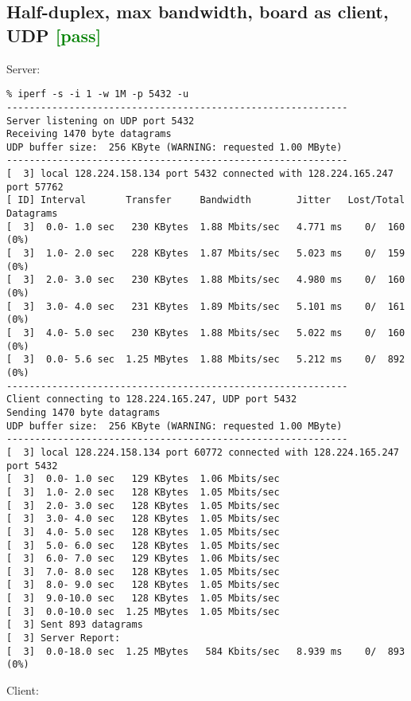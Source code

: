 \documentclass[a4paper]{report}
\begin{document}
\subsection{Half-duplex, max bandwidth, board as client, UDP \textcolor{green}{[pass]}}
Server:
\begin{lstlisting}
% iperf -s -i 1 -w 1M -p 5432 -u
------------------------------------------------------------
Server listening on UDP port 5432
Receiving 1470 byte datagrams
UDP buffer size:  256 KByte (WARNING: requested 1.00 MByte)
------------------------------------------------------------
[  3] local 128.224.158.134 port 5432 connected with 128.224.165.247 port 57762
[ ID] Interval       Transfer     Bandwidth        Jitter   Lost/Total Datagrams
[  3]  0.0- 1.0 sec   230 KBytes  1.88 Mbits/sec   4.771 ms    0/  160 (0%)
[  3]  1.0- 2.0 sec   228 KBytes  1.87 Mbits/sec   5.023 ms    0/  159 (0%)
[  3]  2.0- 3.0 sec   230 KBytes  1.88 Mbits/sec   4.980 ms    0/  160 (0%)
[  3]  3.0- 4.0 sec   231 KBytes  1.89 Mbits/sec   5.101 ms    0/  161 (0%)
[  3]  4.0- 5.0 sec   230 KBytes  1.88 Mbits/sec   5.022 ms    0/  160 (0%)
[  3]  0.0- 5.6 sec  1.25 MBytes  1.88 Mbits/sec   5.212 ms    0/  892 (0%)
------------------------------------------------------------
Client connecting to 128.224.165.247, UDP port 5432
Sending 1470 byte datagrams
UDP buffer size:  256 KByte (WARNING: requested 1.00 MByte)
------------------------------------------------------------
[  3] local 128.224.158.134 port 60772 connected with 128.224.165.247 port 5432
[  3]  0.0- 1.0 sec   129 KBytes  1.06 Mbits/sec
[  3]  1.0- 2.0 sec   128 KBytes  1.05 Mbits/sec
[  3]  2.0- 3.0 sec   128 KBytes  1.05 Mbits/sec
[  3]  3.0- 4.0 sec   128 KBytes  1.05 Mbits/sec
[  3]  4.0- 5.0 sec   128 KBytes  1.05 Mbits/sec
[  3]  5.0- 6.0 sec   128 KBytes  1.05 Mbits/sec
[  3]  6.0- 7.0 sec   129 KBytes  1.06 Mbits/sec
[  3]  7.0- 8.0 sec   128 KBytes  1.05 Mbits/sec
[  3]  8.0- 9.0 sec   128 KBytes  1.05 Mbits/sec
[  3]  9.0-10.0 sec   128 KBytes  1.05 Mbits/sec
[  3]  0.0-10.0 sec  1.25 MBytes  1.05 Mbits/sec
[  3] Sent 893 datagrams
[  3] Server Report:
[  3]  0.0-18.0 sec  1.25 MBytes   584 Kbits/sec   8.939 ms    0/  893 (0%)
\end{lstlisting}
Client:
\end{document}
